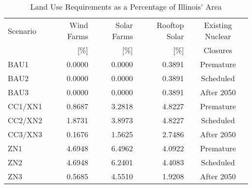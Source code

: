 \begin{table}[H]
  \centering
  \caption{Land Use Requirements as a Percentage of Illinois' Area}
  \label{tab:land-use}
  \begin{tabular}{lrrrc}
    \hline
    Scenario & Wind Farms & Solar Farms & Rooftop Solar & Existing Nuclear \\
    & [\%]& [\%]& [\%]&Closures \\
    \hline
    BAU1 & 0.0000 & 0.0000 & 0.3891 &Premature\\
    BAU2 & 0.0000 & 0.0000 & 0.3891 &Scheduled\\
    BAU3 & 0.0000 & 0.0000 & 0.3891 &After 2050\\
    CC1/XN1 & 0.8687 & 3.2818 & 4.8227 &Premature\\
    CC2/XN2 & 1.8731 & 3.8973 & 4.8227 &Scheduled\\
    CC3/XN3 & 0.1676 & 1.5625 & 2.7486 &After 2050\\
    ZN1 & 4.6948 & 6.4962 & 4.0922 &Premature\\
    ZN2 & 4.6948 & 6.2401 & 4.4083 &Scheduled\\
    ZN3 & 0.5685 & 4.5510 & 1.9208 &After 2050\\
    \hline
  \end{tabular}
\end{table}

